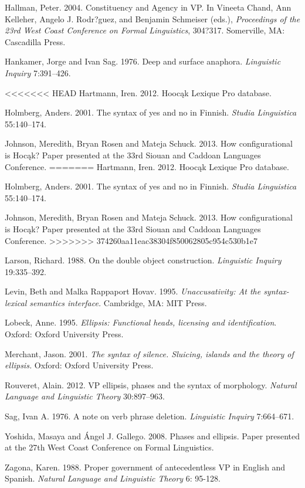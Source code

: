 \documentclass[output=paper]{LSP/langsci}
\begin{document}
\begin{reflist}
Hallman, Peter. 2004. Constituency and Agency in VP. In Vineeta Chand, Ann Kelleher, Angelo J. Rodr?guez, and Benjamin Schmeiser (eds.), \emph{Proceedings of the 23rd West Coast Conference on Formal Linguistics}, 304?317. Somerville, MA: Cascadilla Press.

Hankamer, Jorge and Ivan Sag. 1976. Deep and surface anaphora. \emph{Linguistic Inquiry} 7:391--426.

<<<<<<< HEAD
Hartmann, Iren. 2012. Hoocąk Lexique Pro database.

Holmberg, Anders. 2001. The syntax of yes and no in Finnish. \emph{Studia Linguistica} 55:140--174.

Johnson, Meredith, Bryan Rosen and Mateja Schuck. 2013. How configurational is Hocąk? Paper presented at the 33rd Siouan and Caddoan Languages Conference.
=======
Hartmann, Iren. 2012. Hooc\k{a}k Lexique Pro database.

Holmberg, Anders. 2001. The syntax of yes and no in Finnish. \emph{Studia Linguistica} 55:140--174.

Johnson, Meredith, Bryan Rosen and Mateja Schuck. 2013. How configurational is Hoc\k{a}k? Paper presented at the 33rd Siouan and Caddoan Languages Conference.
>>>>>>> 374260aa11eac38304f850062805c954c530b1e7

Larson, Richard. 1988. On the double object construction. \emph{Linguistic Inquiry} 19:335--392.

Levin, Beth and Malka Rappaport Hovav. 1995. \emph{Unaccusativity: At the syntax-lexical semantics interface.} Cambridge, MA: MIT Press.

Lobeck, Anne. 1995. \emph{Ellipsis: Functional heads, licensing and identification}. Oxford: Oxford University Press.

Merchant, Jason. 2001. \emph{The syntax of silence. Sluicing, islands and the theory of ellipsis.} Oxford: Oxford University Press.

Rouveret, Alain. 2012. VP ellipsis, phases and the syntax of morphology. \emph{Natural Language and Linguistic Theory} 30:897--963. 

Sag, Ivan A. 1976. A note on verb phrase deletion. \emph{Linguistic Inquiry} 7:664--671.

Yoshida, Masaya and \'{A}ngel J. Gallego. 2008. Phases and ellipsis. Paper presented at the 27th West Coast Conference on Formal Linguistics.

Zagona, Karen. 1988. Proper government of antecedentless VP in English and Spanish. \emph{Natural Language and Linguistic Theory} 6: 95-128.

\end{reflist}
\end{document}
